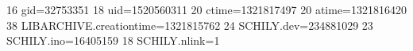 16 gid=32753351
18 uid=1520560311
20 ctime=1321817497
20 atime=1321816420
38 LIBARCHIVE.creationtime=1321815762
24 SCHILY.dev=234881029
23 SCHILY.ino=16405159
18 SCHILY.nlink=1
